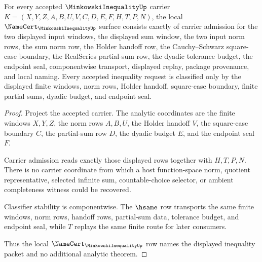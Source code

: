 \begin{theorem}\label{thm:minkowski-inequality-namecert-obligations}
For every accepted $\MinkowskiInequalityUp$ carrier $K=(X,Y,Z,A,B,U,V,C,D,E,F,H,T,P,N)$, the local $\NameCert_{\MinkowskiInequalityUp}$ surface consists exactly of carrier admission for the two displayed input windows, the displayed sum window, the two input norm rows, the sum norm row, the Holder handoff row, the Cauchy--Schwarz square-case boundary, the RealSeries partial-sum row, the dyadic tolerance budget, the endpoint seal, componentwise transport, displayed replay, package provenance, and local naming. Every accepted inequality request is classified only by the displayed finite windows, norm rows, Holder handoff, square-case boundary, finite partial sums, dyadic budget, and endpoint seal.
\end{theorem}
\begin{proof}
Project the accepted carrier. The analytic coordinates are the finite windows $X,Y,Z$, the norm rows $A,B,U$, the Holder handoff $V$, the square-case boundary $C$, the partial-sum row $D$, the dyadic budget $E$, and the endpoint seal $F$.

Carrier admission reads exactly those displayed rows together with $H,T,P,N$. There is no carrier coordinate from which a host function-space norm, quotient representative, selected infinite sum, countable-choice selector, or ambient completeness witness could be recovered.

Classifier stability is componentwise. The $\hsame$ row transports the same finite windows, norm rows, handoff rows, partial-sum data, tolerance budget, and endpoint seal, while $T$ replays the same finite route for later consumers.

Thus the local $\NameCert_{\MinkowskiInequalityUp}$ row names the displayed inequality packet and no additional analytic theorem.
\end{proof}

